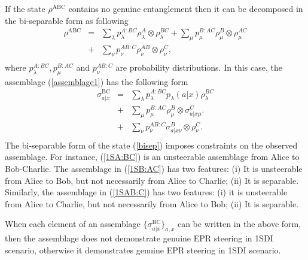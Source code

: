 \documentclass[reprint,superscriptaddress,nofootinbib,amsmath,amssymb,aps,pra,longbibliography]{revtex4-1}
\begin{document}
If the state $\rho^{\text{ABC}}$ contains no genuine entanglement then it can be decomposed in the bi-separable form as following 
\begin{eqnarray} \nonumber
	\rho^{\text{ABC}} &=& \sum_\lambda p_\lambda^{A:BC}\rho_\lambda^A \otimes \rho_\lambda^{BC} 
						 + \sum_\mu p_\mu^{B:AC}\rho_\mu^B\otimes \rho_\mu^{AC}\\ \nonumber
						 &+& \sum_\nu p_\nu^{AB:C} \rho_{\nu}^{AB}\otimes \rho_\nu^C,\\ 
\label{bisep}
\end{eqnarray} 
where $p_\lambda^{A:BC}, p_\mu^{B:AC}$ and $p_\nu^{AB:C}$ are probability distributions.
In this case, the assemblage (\ref{assemblage1}) has the following form \cite{Cavalcanti15}
\begin{eqnarray} 
	\sigma^{\text{BC}}_{a|x} &=& \sum_\lambda p_\lambda^{A:BC}p_\lambda(a|x)\rho_\lambda^{BC}
							\label{1SA:BC} \\
						 &+& \sum_\mu p_\mu^{B:AC}\rho_\mu^B\otimes \sigma_{a|x\mu}^{C} 
						        \label{1SB:AC}. \\ 
						 &+& \sum_\nu p_\nu^{AB:C} \sigma_{a|x\nu}^{B}\otimes \rho_\nu^C. \label{1SAB:C} \\
						 \nonumber 
\end{eqnarray} 
The bi-separable form of the state (\ref{bisep}) imposes constraints on the observed assemblage. For instance, (\ref{1SA:BC}) is an unsteerable assemblage from Alice to Bob-Charlie. The assemblage in (\ref{1SB:AC}) has two features: (i) It is unsteerable from Alice to Bob, but not necessarily from Alice to Charlie; (ii) It is separable. Similarly, the assemblage in (\ref{1SAB:C}) has two features: (i) it is unsteerable from Alice to Charlie, but not necessarily from Alice to Bob; (ii) It is separable. 

When each element of an assemblage $\{\sigma^{\text{BC}}_{a|x}\}_{a,x}$ can be written in the above form, then the assemblage does not demonstrate genuine EPR steering in 1SDI scenario, otherwise it demonstrates genuine EPR steering in 1SDI scenario. 

\end{document}
